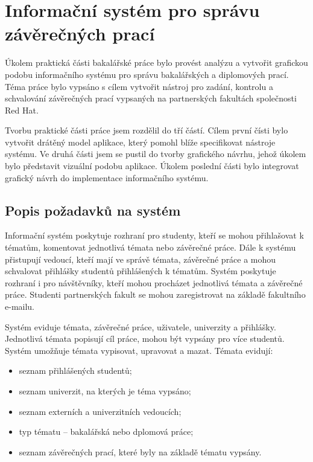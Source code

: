 \chapter{Informační systém pro správu závěrečných prací}

Úkolem praktická části bakalářské práce bylo provést analýzu a vytvořit grafickou podobu informačního systému pro správu bakalářských a diplomových prací. Téma práce bylo vypsáno s cílem vytvořit nástroj pro zadání, kontrolu a schvalování závěrečných prací vypsaných na partnerských fakultách společnosti Red Hat.

Tvorbu praktické části práce jsem rozdělil do tří částí. Cílem první čísti bylo vytvořit drátěný model aplikace, který pomohl blíže specifikovat nástroje systému. Ve druhá části jsem se pustil do tvorby grafického návrhu, jehož úkolem bylo představit vizuální podobu aplikace. Úkolem poslední části bylo integrovat grafický návrh do implementace informačního systému.

\section{Popis požadavků na systém}

Informační systém poskytuje rozhraní pro studenty, kteří se mohou přihlašovat k tématům, komentovat jednotlivá témata nebo závěrečné práce. Dále k systému přistupují vedoucí, kteří mají ve správě témata, závěrečné práce a mohou schvalovat přihlášky studentů přihlášených k tématům. Systém poskytuje rozhraní i pro návštěvníky, kteří mohou procházet jednotlivá témata a závěrečné práce. Studenti partnerských fakult se mohou zaregistrovat na základě fakultního e-mailu.

Systém eviduje témata, závěrečné práce, uživatele, univerzity a přihlášky. Jednotlivá témata popisují cíl práce, mohou být vypsány pro více studentů. Systém umožňuje témata vypisovat, upravovat a mazat. Témata evidují:

\begin{itemize}
    \item seznam přihlášených studentů;
    \item seznam univerzit, na kterých je téma vypsáno;
    \item seznam externích a univerzitních vedoucích;
    \item typ tématu -- bakalářská nebo dplomová práce;
    \item seznam závěrečných prací, které byly na základě tématu vypsány.
\end{itemize}

